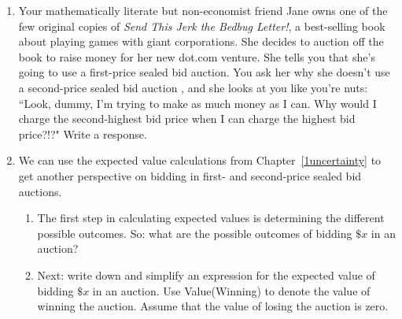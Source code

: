 \begin{enumerate}
\item Your mathematically literate but non-economist friend Jane owns one of the few original copies of \emph{Send This Jerk the Bedbug Letter!}, a best-selling book about playing games with giant corporations. She decides to auction off the book to raise money for her new dot.com venture. She tells you that she's going to use a first-price sealed bid auction.  You ask her why she doesn't use a second-price sealed bid auction , and she looks at you like you're nuts: ``Look, dummy, I'm trying to make as much money as I can. Why would I charge the second-highest bid price when I can charge the highest bid price?!?" Write a response.










\item \label{auctionsexp} We can use the expected value calculations from Chapter~\ref{1uncertainty} to get another perspective on bidding in first- and second-price sealed bid auctions.

    \begin{enumerate}

    \item The first step in calculating expected values is determining the different possible outcomes. So: what are the possible outcomes of bidding $\$x$ in an auction?


    \item Next: write down and simplify an expression for the expected value of bidding $\$x$ in an auction. Use Value(Winning) to denote the value of winning the auction. Assume that the value of losing the auction is zero.



\end{enumerate}
\end{enumerate}
